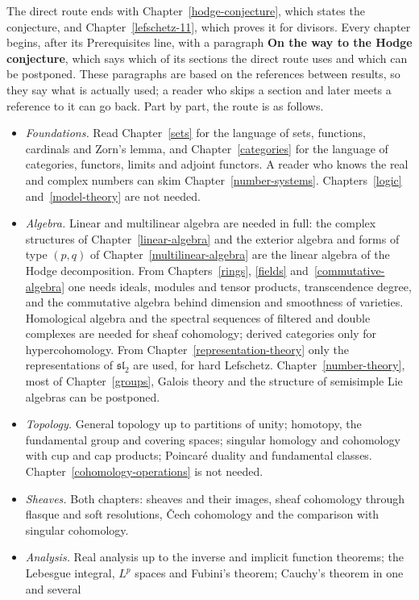 The direct route ends with Chapter~\ref{hodge-conjecture}, which states the conjecture, and Chapter~\ref{lefschetz-11}, which proves it for divisors. Every chapter begins,
after its Prerequisites line, with a paragraph \textbf{On the way to the Hodge conjecture}, which says which of its sections the direct route uses and which can be postponed.
These paragraphs are based on the references between results, so they say what is actually used; a reader who skips a section and later meets a reference to it can go back.
Part by part, the route is as follows.
\begin{itemize}
\item \emph{Foundations.} Read Chapter~\ref{sets} for the language of sets, functions, cardinals and Zorn's lemma, and Chapter~\ref{categories} for the language of categories,
functors, limits and adjoint functors. A reader who knows the real and complex numbers can skim Chapter~\ref{number-systems}. Chapters~\ref{logic} and~\ref{model-theory} are
not needed.
\item \emph{Algebra.} Linear and multilinear algebra are needed in full: the complex structures of Chapter~\ref{linear-algebra} and the exterior algebra and forms of type $(p,q)$ of
Chapter~\ref{multilinear-algebra} are the linear algebra of the Hodge decomposition. From Chapters~\ref{rings}, \ref{fields} and~\ref{commutative-algebra} one needs ideals,
modules and tensor products, transcendence degree, and the commutative algebra behind dimension and smoothness of varieties. Homological algebra and the spectral sequences of filtered
and double complexes are needed for sheaf cohomology; derived categories only for hypercohomology. From Chapter~\ref{representation-theory} only the representations of
$\mathfrak{sl}_2$ are used, for hard Lefschetz. Chapter~\ref{number-theory}, most of Chapter~\ref{groups}, Galois theory and the structure of semisimple Lie algebras can be
postponed.
\item \emph{Topology.} General topology up to partitions of unity; homotopy, the fundamental group and covering spaces; singular homology and cohomology with cup and cap products;
Poincar\'e duality and fundamental classes. Chapter~\ref{cohomology-operations} is not needed.
\item \emph{Sheaves.} Both chapters: sheaves and their images, sheaf cohomology through flasque and soft resolutions, \v{C}ech cohomology and the comparison with singular cohomology.
\item \emph{Analysis.} Real analysis up to the inverse and implicit function theorems; the Lebesgue integral, $L^p$ spaces and Fubini's theorem; Cauchy's theorem in one and several

\end{itemize}
